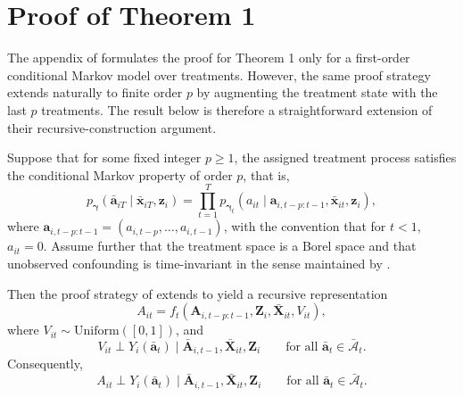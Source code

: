 \chapter{Proof of Theorem 1}
\label{proof_theorem_1}
The appendix of  
formulates the proof for Theorem 1 only for a first-order
conditional Markov model over treatments. 
However, the same proof strategy extends naturally
to finite order \(p\) by augmenting the treatment state with the 
last \(p\) treatments. The
result below is therefore a straightforward extension
of their recursive-construction argument. 

\begin{proposition}
Suppose that for some fixed integer \(p \ge 1\), the assigned treatment process satisfies
the conditional Markov property of order \(p\), that is,
\begin{equation}
\label{eq:p-order-cmm}
p_{\boldsymbol{\gamma}}(\bar{\mathbf{a}}_{iT}\mid \bar{\mathbf{x}}_{iT},\mathbf{z}_i)
=
\prod_{t=1}^T
p_{\boldsymbol{\gamma}_t}(a_{it}\mid \mathbf{a}_{i,t-p:t-1},\bar{\mathbf{x}}_{it},\mathbf{z}_i),
\end{equation}
where \(\mathbf{a}_{i,t-p:t-1}=(a_{i,t-p},\dots,a_{i,t-1})\), with the convention that for \(t<1\),
\(a_{it}=0\). Assume further that the treatment space is a Borel space and that unobserved
confounding is time-invariant in the sense maintained by .

Then the proof strategy of  extends to yield a recursive representation
\begin{equation}
\label{eq:p-order-recursion}
A_{it} = f_t(\mathbf{A}_{i,t-p:t-1},\mathbf{Z}_i,\bar{\mathbf{X}}_{it},V_{it}),
\end{equation}
where \(V_{it} \sim \mathrm{Uniform}([0,1])\), and
\begin{equation}
\label{eq:p-order-v-indep}
V_{it} \perp Y_i(\bar{\mathbf{a}}_t)\mid \bar{\mathbf{A}}_{i,t-1},\bar{\mathbf{X}}_{it},\mathbf{Z}_i
\qquad
\text{for all } \bar{\mathbf{a}}_t \in \bar{\mathcal A}_t.
\end{equation}
Consequently,
\begin{equation}
\label{eq:p-order-ssi}
A_{it} \perp Y_i(\bar{\mathbf{a}}_t)\mid \bar{\mathbf{A}}_{i,t-1},\bar{\mathbf{X}}_{it},\mathbf{Z}_i
\qquad
\text{for all } \bar{\mathbf{a}}_t \in \bar{\mathcal A}_t.
\end{equation}
\end{proposition}

